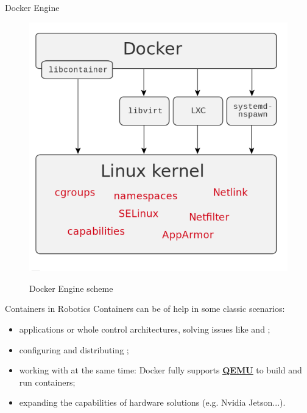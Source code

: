 \begin{frame}{Docker Engine}
\begin{figure}
  \centering
  \includegraphics[scale=.3]{dockerScheme.png}
  \label{fig:dockerscheme}
  \caption{Docker Engine scheme}
\end{figure}
\end{frame}

\begin{frame}{Containers in Robotics}
Containers can be of help in some classic scenarios:
\begin{itemize}
  \item {} applications or whole control architectures, solving issues like  and ;
  \item configuring and distributing ;
  \item working with  at the same time: Docker fully supports \href{https://www.qemu.org/}{\color{blue}\textbf{\underline{QEMU}}} to build and run containers;
  \item expanding the capabilities of  hardware solutions (e.g. Nvidia Jetson...).
\end{itemize}
\end{frame}

